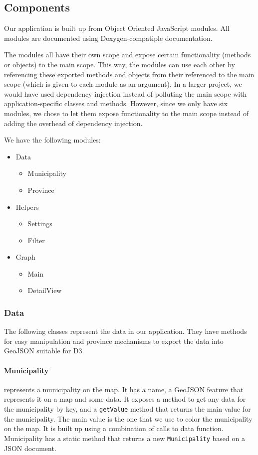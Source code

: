 	\subsection{Components}
		Our application is built up from Object Oriented JavaScript modules.
		All modules are documented using Doxygen-compatiple documentation.

		The modules all have their own scope and expose certain functionality (methods or objects) to the main scope.
		This way, the modules can use each other by referencing these exported methods and objects from their referenced to the main scope (which is given to each module as an argument).
		In a larger project, we would have used dependency injection instead of polluting the main scope with application-specific classes and methods.
		However, since we only have six modules, we chose to let them expose functionality to the main scope instead of adding the overhead of dependency injection.

		We have the following modules:

		\begin{itemize}
			\item Data
				\begin{itemize}
					\item Municipality
					\item Province
				\end{itemize}
			\item Helpers
				\begin{itemize}
					\item Settings
					\item Filter
				\end{itemize}
			\item Graph
				\begin{itemize}
					\item Main
					\item DetailView
				\end{itemize}
		\end{itemize}

		\subsubsection{Data}
			The following classes represent the data in our application.
			They have methods for easy manipulation and province mechanisms to export the data into GeoJSON suitable for D3.

			\paragraph{Municipality} represents a municipality on the map.
				It has a name, a GeoJSON feature that represents it on a map and some data.
				It exposes a method to get any data for the municipality by key, and a \texttt{getValue} method that returns the main value for the municipality.
				The main value is the one that we use to color the municipality on the map.
				It is built up using a combination of calls to data function.
				Municipality has a static method that returns a new \texttt{Municipality} based on a JSON document.


